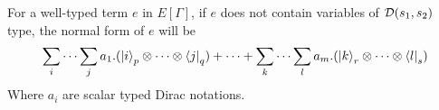 \begin{lemma}
    \label{lem: labelled normal form}
    For a well-typed term $e$ in $E[\Gamma]$, if $e$ does not contain variables of $\mathcal{D}(s_1, s_2)$ type, the normal form of $e$ will be
    \[
    \sum_{i}\cdots\sum_{j} a_1 . (\ket{i}_{p} \otimes \cdots \otimes \bra{j}_{q})
    + \cdots +
    \sum_{k}\cdots\sum_{l} a_m . (\ket{k}_{r} \otimes \cdots \otimes \bra{l}_{s})
    \]
    Where $a_i$ are scalar typed Dirac notations.
\end{lemma}


